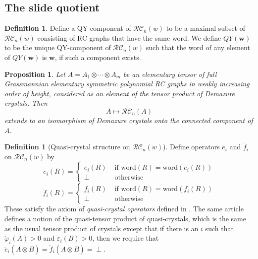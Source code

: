 \documentclass{amsart}
\newtheorem{corollary}[lemma]{Corollary}
\newtheorem{proposition}[lemma]{Proposition}
\theoremstyle{definition}
\newtheorem{definition}[lemma]{Definition}
\theoremstyle{remark}
\numberwithin{equation}{subsection}
\newcommand{\wof}[1]{w_{#1}}
\newcommand{\RC}{\mathcal{RC}}
\newcommand{\maxd}{\mathfrak{m}}
\begin{document}
\subsection{The slide quotient}


\begin{definition}
Define a QY-component of $\RC_n(w)$ to be a maximal subset of $\RC_n(w)$ consisting of RC graphs that have the same word. We define $QY(\mathbf{w})$ to be the unique QY-component of $\RC_n(w)$ such that the word of any element of $QY(\mathbf{w})$ is $\mathbf{w}$, if such a component exists.
\end{definition}

\begin{proposition}
Let $A = A_1\otimes\cdots \otimes A_m$ be an elementary tensor of full Grassmannian elementary symmetric polynomial RC graphs in weakly increasing order of height, considered as an element of the tensor product of Demazure crystals. Then 
$$A\mapsto\RC_n(A)$$
extends to an isomorphism of Demazure crystals onto the connected component of $A$.
\end{proposition}


\begin{definition}[Quasi-crystal structure on $\RC_n(w)$]
Define operators $\ddot{e}_i$ and $\ddot{f}_i$ on $\RC_n(w)$ by
$$\ddot{e}_i(R) = \begin{cases}
  e_i(R) & \text{ if }\mathrm{word}(R) = \mathrm{word}(e_i(R))\\
  \perp & \text{ otherwise}
\end{cases}$$
$$\ddot{f}_i(R) = \begin{cases}
  f_i(R) & \text{ if }\mathrm{word}(R) = \mathrm{word}(f_i(R))\\
  \perp & \text{ otherwise}
\end{cases}$$
These satisfy the axiom of \emph{quasi-crystal operators} defined in \cite{cain2023quasicrystals}. The same article defines a notion of the quasi-tensor product of quasi-crystals, which is the same as the usual tensor product of crystals except that if there is an $i$ such that $\ddot{\varphi}_i(A)>0$ and $\ddot{\varepsilon}_i(B)>0$, then we require that $\ddot{e}_i(A\ddot{\otimes} B) =\ddot{f}_i(A\ddot{\otimes} B)= \perp$.
\end{definition}
\end{document}
